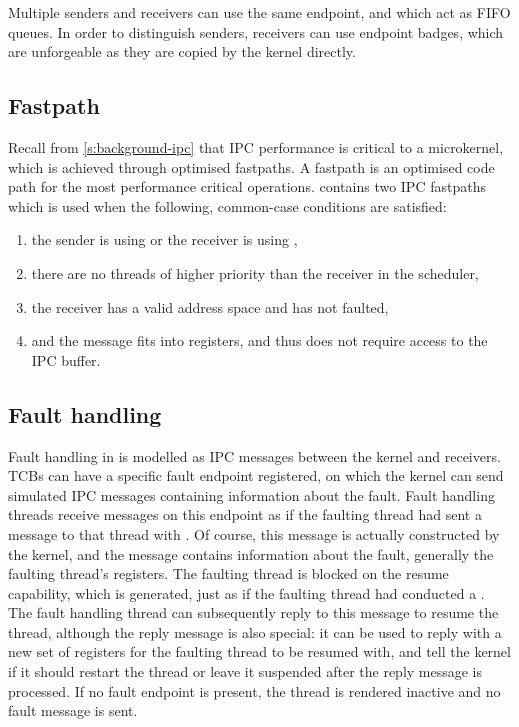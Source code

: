 Multiple senders and receivers can use the same endpoint, and which act as \gls{FIFO}
queues. In order to distinguish senders, receivers can use endpoint badges, which are unforgeable as
they are copied by the kernel directly. 

\subsection{Fastpath}
\label{sec:sel4-fastpath}

Recall from \cref{s:background-ipc} that \gls{IPC} performance is critical to a microkernel, which
is achieved through optimised fastpaths. A fastpath is an optimised code path for the most
performance critical operations. \selfour
contains two \gls{IPC} fastpaths which is used when the following, common-case conditions are satisfied:

\begin{enumerate}
    \item the sender is using \call or the receiver is using \replyrecv,
    \item there are no threads of higher priority than the receiver in the scheduler,
    \item the receiver has a valid address space and has not faulted,
    \item and the message fits into registers, and thus does not require access to the IPC buffer.
\end{enumerate}

\subsection{Fault handling}
\label{api:faults}

Fault handling in \selfour is modelled as IPC messages between the kernel and receivers. 
\glspl{TCB} can have a specific fault endpoint registered, on which the kernel can send simulated
\gls{IPC} messages containing information about the fault. Fault handling threads receive messages
on this endpoint as if the faulting thread had sent a message to that thread with \call. Of
course, this message is actually constructed by the kernel, and the message contains information
about the fault, generally the faulting thread's registers. The faulting thread is blocked on the
resume capability, which is generated, just as if the faulting thread had conducted a \call.
The fault handling thread can subsequently reply to this message to
resume the thread, although the reply message is also special: it can be used to reply with a new
set of registers for the faulting thread to be resumed with, and tell the kernel if it should
restart the thread or leave it suspended after the reply message is processed.
If no fault endpoint is present, the
thread is rendered inactive and no fault message is sent. 

